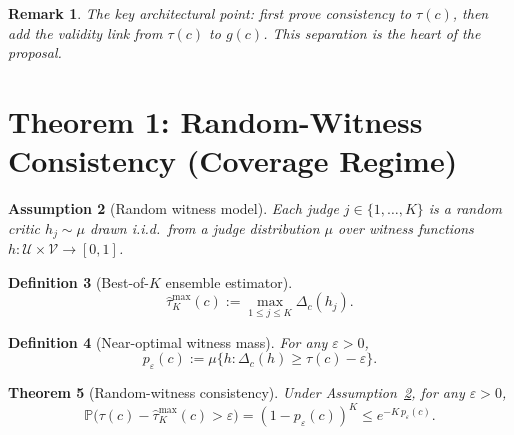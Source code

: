 \documentclass[11pt]{article}
\newtheorem{theorem}{Theorem}[section]
\newtheorem{definition}[theorem]{Definition}
\newtheorem{assumption}[theorem]{Assumption}
\newtheorem{remark}[theorem]{Remark}
\newcommand{\Prob}{\mathbb{P}}
\newcommand{\cU}{\mathcal{U}}
\newcommand{\cV}{\mathcal{V}}
\begin{document}
\begin{remark}
The key architectural point: first prove consistency to $\tau(c)$, then
add the validity link from $\tau(c)$ to $g(c)$. This separation is the
heart of the proposal.
\end{remark}

\section{Theorem 1: Random-Witness Consistency (Coverage Regime)}
\label{sec:coverage}

\begin{assumption}[Random witness model]
\label{asm:random-witness}
Each judge $j \in \{1, \ldots, K\}$ is a random critic
$h_j \sim \mu$ drawn i.i.d.\ from a judge distribution $\mu$ over
witness functions $h : \cU \times \cV \to [0,1]$.
\end{assumption}

\begin{definition}[Best-of-$K$ ensemble estimator]
\label{def:best-of-K}
\begin{equation}
\hat\tau^{\max}_K(c) := \max_{1 \le j \le K} \Delta_c(h_j).
\end{equation}
\end{definition}

\begin{definition}[Near-optimal witness mass]
\label{def:near-optimal-mass}
For any $\varepsilon > 0$,
\begin{equation}
p_\varepsilon(c) := \mu\big\{h : \Delta_c(h) \ge \tau(c) - \varepsilon\big\}.
\end{equation}
\end{definition}

\begin{theorem}[Random-witness consistency]
\label{thm:coverage}
Under Assumption~\ref{asm:random-witness}, for any $\varepsilon > 0$,
\begin{equation}
\Prob\!\big(\tau(c) - \hat\tau^{\max}_K(c) > \varepsilon\big)
= (1 - p_\varepsilon(c))^K
\le e^{-K \, p_\varepsilon(c)}.
\end{equation}
\end{theorem}
\end{document}
